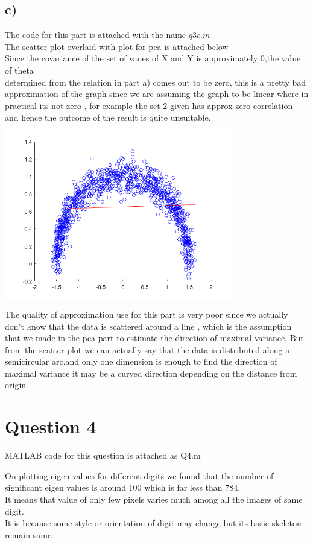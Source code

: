\documentclass{article}
\begin{document}
\subsection*{c)}
The code for this part is attached with the name $q3c.m$ \\
The scatter plot overlaid with plot for pca is attached below\\
Since the covariance of the set of vaues of X and Y is approximately 0,the value of theta\\ determined from the relation in part a) comes out to be zero, this is a pretty bad approximation of the graph since we are assuming the graph to be linear where in practical its not zero , for example the set 2 given has approx zero correlation and hence the outcome of the result is quite unsuitable.\\
    {\includegraphics[width =10cm, height=8cm]{hw4/q3c.png}}\\
The quality of approximation use for this part is very poor since we actually don't know that the data is scattered around a line , which is the assumption that we made in the pca part to estimate the direction of maximal variance, But from the scatter plot we can actually say that the data is distributed along a semicircular arc,and only one dimension is enough to find the direction of maximal variance it may be a curved direction depending on the distance from origin\\ 
\section*{Question 4}
MATLAB code for this question is attached as Q4.m

On plotting eigen values for different digits we found that the number of significant eigen values is around 100 which is far less than 784.\\ 
It means that value of only few pixels varies much among all the images of same digit.\\ It is because some style or orientation of digit may change but its basic skeleton remain same.
\end{document}
